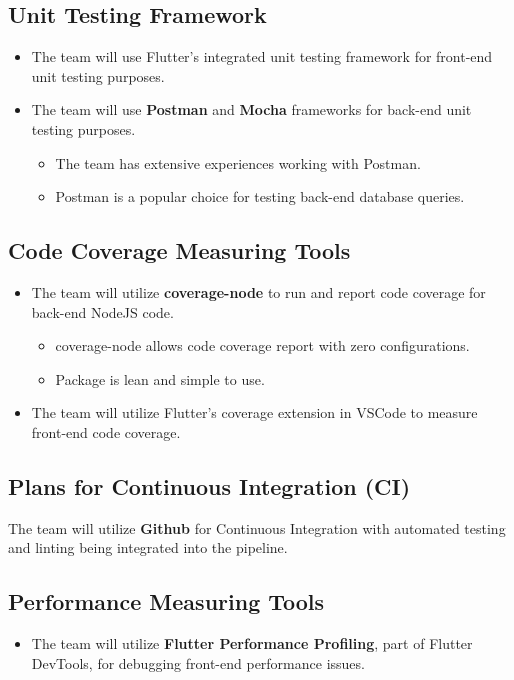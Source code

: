 \documentclass{article}
\begin{document}
\subsection{Unit Testing Framework}
    \begin{itemize}
        \item The team will use Flutter's integrated unit testing framework for front-end unit testing purposes.
        \item The team will use \textbf{Postman} and \textbf{Mocha} frameworks for back-end unit testing purposes.
        \begin{itemize}
            \item The team has extensive experiences working with Postman.
            \item Postman is a popular choice for testing back-end database queries.
        \end{itemize}
    \end{itemize}
\subsection{Code Coverage Measuring Tools}
    \begin{itemize}
        \item The team will utilize \textbf{coverage-node} to run and report code coverage for back-end NodeJS code.
        \begin{itemize}
            \item coverage-node allows code coverage report with zero configurations.
            \item Package is lean and simple to use.
        \end{itemize}
        \item The team will utilize Flutter's coverage extension in VSCode to measure front-end code coverage.
    \end{itemize}
\subsection{Plans for Continuous Integration (CI)}
    The team will utilize \textbf{Github} for Continuous Integration with automated testing and linting being integrated into the pipeline.
\subsection{Performance Measuring Tools}
    \begin{itemize}
        \item The team will utilize \textbf{Flutter Performance Profiling}, part  of  Flutter DevTools, for debugging front-end performance issues.
    \end{itemize}
\end{document}
